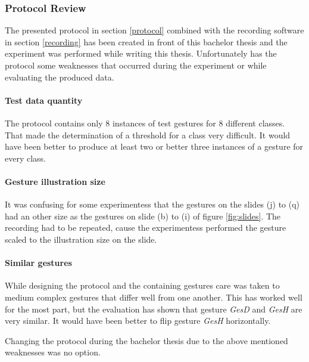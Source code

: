 \subsubsection{Protocol Review} \label{protocol_review}
The presented protocol in section \ref{protocol} combined with the recording software in section \ref{recording} has
been created in front of this bachelor thesis and the experiment was performed while writing this thesis. Unfortunately
has the protocol some weaknesses that occurred during the experiment or while evaluating the produced data.

\paragraph{Test data quantity} The protocol contains only 8 instances of test gestures for 8 different classes. That
made the determination of a threshold for a class very difficult. It would have been better to produce at least two or
better three instances of a gesture for every class.

\paragraph{Gesture illustration size} It was confusing for some experimentess that the gestures on the slides (j) to (q)
had an other size as the gestures on slide (b) to (i) of figure \ref{fig:slides}. The recording had to be repeated,
cause the experimentess performed the gesture scaled to the illustration size on the slide.

\paragraph{Similar gestures} While designing the protocol and the containing gestures care was taken to medium complex
gestures that differ well from one another. This has worked well for the most part, but the evaluation has shown that
gesture \textit{GesD} and \textit{GesH} are very similar. It would have been better to flip gesture \textit{GesH}
horizontally.

Changing the protocol during the bachelor thesis due to the above mentioned weaknesses was no option.
